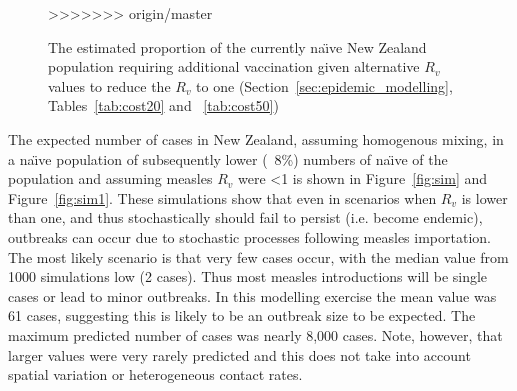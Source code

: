 \documentclass{article}
\begin{document}
\begin{itemize}
\begin{figure}[width=1\textwidth]
     \caption{The estimated proportion of the currently na\"{\i}ve New Zealand population requiring additional vaccination given alternative $R_v$ values to reduce the $R_v$ to one (Section~\ref{sec:epidemic_modelling}, Tables~\ref{tab:cost20} and ~\ref{tab:cost50})}
>>>>>>> origin/master
     \label{fig:numvac}
\end{figure}

The expected number of cases in New Zealand, assuming homogenous mixing, in a na\"{\i}ve population of subsequently lower (~8\%) numbers of na\"{\i}ve of the population and assuming measles $R_v$ were <1 is shown in Figure~\ref{fig:sim} and Figure~\ref{fig:sim1}. These simulations show that even in scenarios when $R_v$ is lower than one, and thus stochastically should fail to persist (i.e. become endemic), outbreaks can occur due to stochastic processes following measles importation. The most likely scenario is that very few cases occur, with the median value from 1000 simulations low (2 cases). Thus most measles introductions will be single cases or lead to minor outbreaks. In this modelling exercise the mean value was 61 cases, suggesting this is likely to be an outbreak size to be expected. The maximum predicted number of cases was nearly 8,000 cases. Note, however, that larger values were very rarely predicted and this does not take into account spatial variation or heterogeneous contact rates.



\end{itemize}
\end{document}
